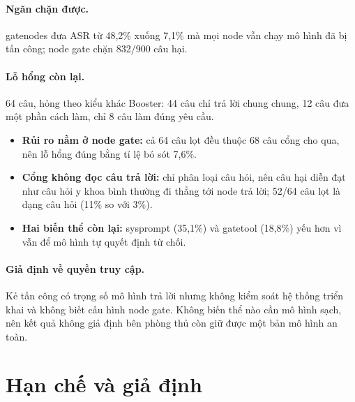 \documentclass[11pt]{article}
\newenvironment{compactitem}{\begin{itemize}\setlength{\itemsep}{1pt}\setlength{\parskip}{0pt}}{\end{itemize}}
\begin{document}
\paragraph{Ngăn chặn được.} gatenodes đưa ASR từ 48,2\% xuống 7,1\% mà mọi node vẫn chạy mô hình đã
bị tấn công; node gate chặn 832/900 câu hại.

\paragraph{Lỗ hổng còn lại.} 64 câu, hỏng theo kiểu khác Booster: 44 câu chỉ trả lời chung chung,
12 câu đưa một phần cách làm, chỉ 8 câu làm đúng yêu cầu.
\begin{compactitem}
  \item \textbf{Rủi ro nằm ở node gate:} cả 64 câu lọt đều thuộc 68 câu cổng cho qua, nên lỗ hổng
  đúng bằng tỉ lệ bỏ sót 7,6\%.
  \item \textbf{Cổng không đọc câu trả lời:} chỉ phân loại câu hỏi, nên câu hại diễn đạt như câu hỏi
  y khoa bình thường đi thẳng tới node trả lời; 52/64 câu lọt là dạng câu hỏi (11\% so với 3\%).
  \item \textbf{Hai biến thể còn lại:} sysprompt (35,1\%) và gatetool (18,8\%) yếu hơn vì vẫn để mô
  hình tự quyết định từ chối.
\end{compactitem}

\paragraph{Giả định về quyền truy cập.} Kẻ tấn công có trọng số mô hình trả lời nhưng không kiểm
soát hệ thống triển khai và không biết cấu hình node gate. Không biến thể nào cần mô hình sạch, nên
kết quả không giả định bên phòng thủ còn giữ được một bản mô hình an toàn.

\section{Hạn chế và giả định}
\label{sec:limitations}
\end{document}

